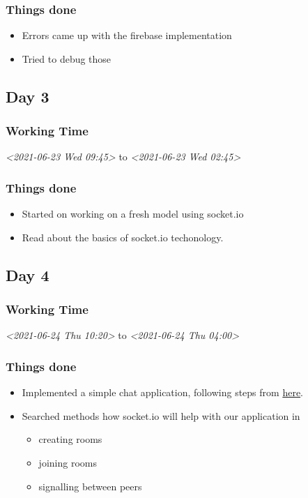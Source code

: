 \documentclass[11pt]{article}
\begin{document}
\subsubsection*{Things done}
\label{sec:org7b62851}
\begin{itemize}
\item Errors came up with the firebase implementation
\item Tried to debug those
\end{itemize}

\subsection*{Day 3}
\label{sec:org145426d}

\subsubsection*{Working Time}
\label{sec:org5c1deb8}
\textit{<2021-06-23 Wed 09:45> } to \textit{<2021-06-23 Wed 02:45>}

\subsubsection*{Things done}
\label{sec:org7c26fb5}
\begin{itemize}
\item Started on working on a fresh model using socket.io
\item Read about the basics of socket.io techonology.
\end{itemize}

\subsection*{Day 4}
\label{sec:orgdd35a91}
\subsubsection*{Working Time}
\label{sec:org37832e3}
\textit{<2021-06-24 Thu 10:20> } to \textit{<2021-06-24 Thu 04:00>}

\subsubsection*{Things done}
\label{sec:org6b60faf}
\begin{itemize}
\item Implemented a simple chat application, following steps from \href{https://socket.io/get-started/chat}{here}.
\item Searched methods how socket.io will help with our application in
\begin{itemize}
\item creating rooms
\item joining rooms
\item signalling between peers
\end{itemize}
\end{itemize}
\end{document}
